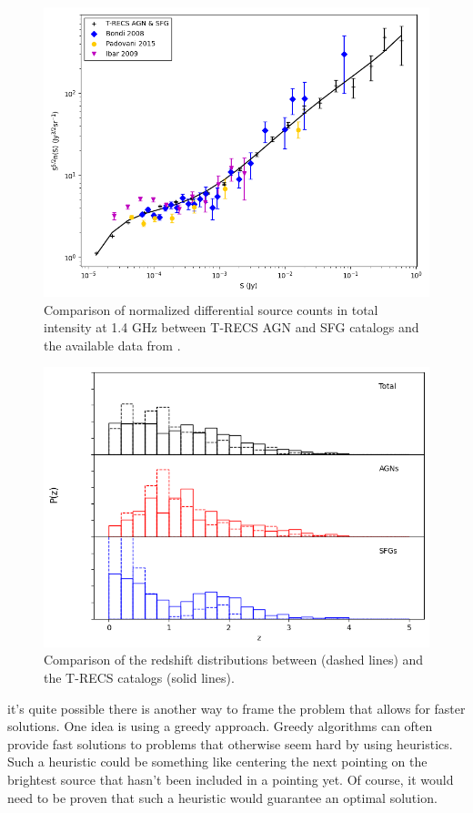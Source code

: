 \documentclass{article}
\begin{document}
\begin{multicols*}{2}
\begin{figure}[H]
    \includegraphics[width=\linewidth]{images/differential_src_counts.png}
    \caption{Comparison of normalized differential source counts in total intensity at 1.4 GHz between T-RECS AGN and SFG catalogs and the available data from \citet{Bondi_2008,Padovani_2015,Ibar_2009}.}
    \label{fig:counts}
\end{figure}
\begin{figure}[H]
    \centering
    \includegraphics[width=\linewidth]{images/redshift.png}
    \caption{Comparison of the redshift distributions between \citet{10.1093/mnras/stw2541} (dashed lines) and the T-RECS catalogs (solid lines).}
    \label{fig:redshift}
\end{figure}
\noindent
it's quite possible there is another way to frame the problem that allows for faster solutions. One idea is using a greedy approach. Greedy algorithms can often provide fast solutions to problems that otherwise seem hard by using heuristics. Such a heuristic could be something like centering the next pointing on the brightest source that hasn't been included in a pointing yet. Of course, it would need to be proven that such a heuristic would guarantee an optimal solution.


\end{multicols*}
\end{document}
